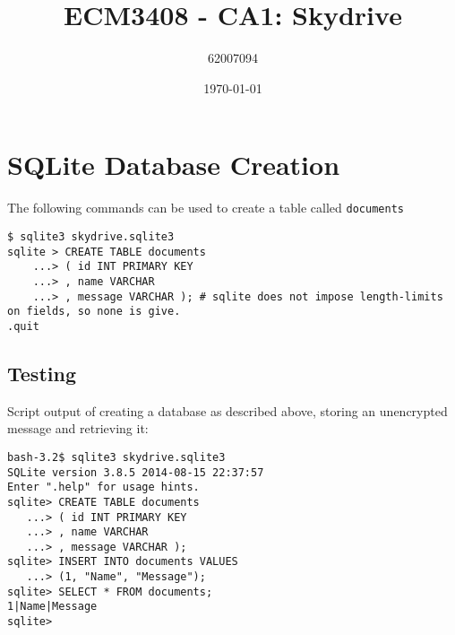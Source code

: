 \documentclass[11pt]{article}
\begin{document}
    \lstset{
    	breaklines=true,
		numbers=left,
		showspaces=false, 
		showstringspaces=false,
    }
    \title{ECM3408 - CA1: Skydrive}
    \author{62007094}
    \date{\today}
    \maketitle
    
    \section{SQLite Database Creation}
    The following commands can be used to create a table called \texttt{documents}
    
    \begin{lstlisting}[basicstyle=\ttfamily]
$ sqlite3 skydrive.sqlite3
sqlite > CREATE TABLE documents
    ...> ( id INT PRIMARY KEY 
    ...> , name VARCHAR
    ...> , message VARCHAR ); # sqlite does not impose length-limits on fields, so none is give.
.quit
    \end{lstlisting}
	
	\subsection{Testing}
	Script output of creating a database as described above, storing an unencrypted message and retrieving it:
	\begin{lstlisting}[basicstyle=\ttfamily]
bash-3.2$ sqlite3 skydrive.sqlite3
SQLite version 3.8.5 2014-08-15 22:37:57
Enter ".help" for usage hints.
sqlite> CREATE TABLE documents
   ...> ( id INT PRIMARY KEY
   ...> , name VARCHAR
   ...> , message VARCHAR );
sqlite> INSERT INTO documents VALUES
   ...> (1, "Name", "Message");
sqlite> SELECT * FROM documents;
1|Name|Message
sqlite>
\end{lstlisting}
\end{document}
